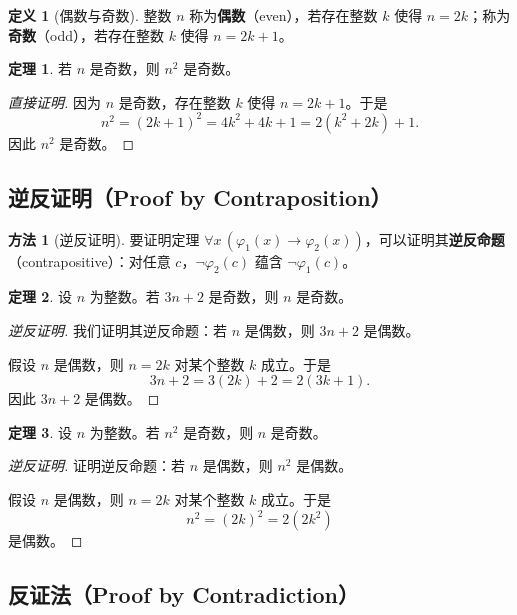 \documentclass[UTF8,11pt,a4paper]{ctexbook}   %
\theoremstyle{definition}
\newtheorem{definition}{定义}[section]
\newtheorem{theorem}{定理}[section]
\newtheorem{method}{方法}[section]
\begin{document}
\begin{definition}[偶数与奇数]
整数 $n$ 称为\textbf{偶数}（even），若存在整数 $k$ 使得 $n = 2k$；称为\textbf{奇数}（odd），若存在整数 $k$ 使得 $n = 2k+1$。
\end{definition}

\begin{theorem}
若 $n$ 是奇数，则 $n^2$ 是奇数。
\end{theorem}

\begin{proof}[直接证明]
因为 $n$ 是奇数，存在整数 $k$ 使得 $n = 2k+1$。于是
\[
n^2 = (2k+1)^2 = 4k^2 + 4k + 1 = 2(k^2 + 2k) + 1.
\]
因此 $n^2$ 是奇数。
\end{proof}

\subsection{逆反证明（Proof by Contraposition）}

\begin{method}[逆反证明]
要证明定理 $\forall x\,(\varphi_1(x) \to \varphi_2(x))$，可以证明其\textbf{逆反命题}（contrapositive）：对任意 $c$，$\neg\varphi_2(c)$ 蕴含 $\neg\varphi_1(c)$。
\end{method}

\begin{theorem}
设 $n$ 为整数。若 $3n+2$ 是奇数，则 $n$ 是奇数。
\end{theorem}

\begin{proof}[逆反证明]
我们证明其逆反命题：若 $n$ 是偶数，则 $3n+2$ 是偶数。

假设 $n$ 是偶数，则 $n = 2k$ 对某个整数 $k$ 成立。于是
\[
3n + 2 = 3(2k) + 2 = 2(3k+1).
\]
因此 $3n+2$ 是偶数。
\end{proof}

\begin{theorem}
设 $n$ 为整数。若 $n^2$ 是奇数，则 $n$ 是奇数。
\end{theorem}

\begin{proof}[逆反证明]
证明逆反命题：若 $n$ 是偶数，则 $n^2$ 是偶数。

假设 $n$ 是偶数，则 $n = 2k$ 对某个整数 $k$ 成立。于是
\[
n^2 = (2k)^2 = 2(2k^2)
\]
是偶数。
\end{proof}

\subsection{反证法（Proof by Contradiction）}
\end{document}

